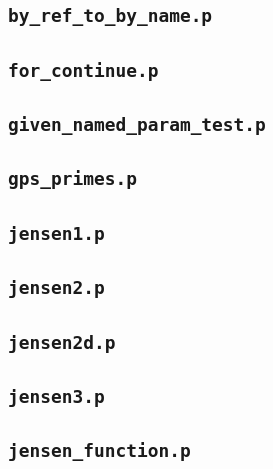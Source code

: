 \documentclass[a4paper,10pt]{article}
\begin{document}
\begin{multicols}{2}
\subsection{\textbf{\texttt{by\_ref\_to\_by\_name.p}}}


\subsection{\textbf{\texttt{for\_continue.p}}}


\subsection{\textbf{\texttt{given\_named\_param\_test.p}}}


\subsection{\textbf{\texttt{gps\_primes.p}}}


\subsection{\textbf{\texttt{jensen1.p}}}


\subsection{\textbf{\texttt{jensen2.p}}}


\subsection{\textbf{\texttt{jensen2d.p}}}


\subsection{\textbf{\texttt{jensen3.p}}}


\subsection{\textbf{\texttt{jensen\_function.p}}}



\end{multicols}
\end{document}

